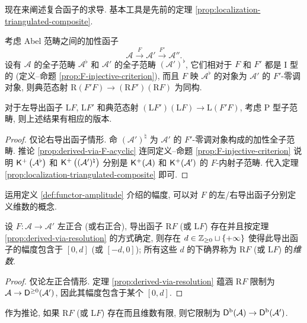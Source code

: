 现在来阐述复合函子的求导. 基本工具是先前的定理 \ref{prop:localization-triangulated-composite}.

\begin{theorem}[复合函子求导]\label{prop:derived-composite}
	考虑 Abel 范畴之间的加性函子
	\[ \mathcal{A} \xrightarrow{F} \mathcal{A}' \xrightarrow{F'} \mathcal{A}''. \]
	设有 $\mathcal{A}$ 的全子范畴 $\mathcal{A}^\flat$ 和 $\mathcal{A}'$ 的全子范畴 $(\mathcal{A}')^\flat$, 它们相对于 $F$ 和 $F'$ 都是 I 型的 (定义--命题 \ref{prop:F-injective-criterion}), 而且 $F$ 映 $\mathcal{A}^\flat$ 的对象为 $\mathcal{A}'$ 的 $F'$-零调对象, 则典范态射 $\mathrm{R}(F'F) \to (\mathrm{R}F') (\mathrm{R}F)$ 为同构.

	对于左导出函子 $\mathrm{L}F$, $\mathrm{L}F'$ 和典范态射 $\left( \mathrm{L}F' \right) \left( \mathrm{L}F \right) \to \mathrm{L}(F' F)$, 考虑 P 型子范畴, 则上述结果有相应的版本.
\end{theorem}
\begin{proof}
	仅论右导出函子情形. 命 $(\mathcal{A}')^\natural$ 为 $\mathcal{A}'$ 的 $F'$-零调对象构成的加性全子范畴. 推论 \ref{prop:derived-via-F-acyclic} 连同定义--命题 \ref{prop:F-injective-criterion} 说明 $\mathsf{K}^+ \left( \mathcal{A}^\flat \right)$ 和 $\mathsf{K}^+ \left((\mathcal{A}')^\natural\right)$ 分别是 $\mathsf{K}^+(\mathcal{A})$ 和 $\mathsf{K}^+(\mathcal{A}')$ 的 $F$-内射子范畴. 代入定理 \ref{prop:localization-triangulated-composite} 即可.
\end{proof}

运用定义 \ref{def:functor-amplitude} 介绍的幅度, 可以对 $F$ 的左/右导出函子分别定义维数的概念.

\begin{definition-proposition}\label{def:dim-functor}
	设 $F: \mathcal{A} \to \mathcal{A}'$ 左正合 (或右正合), 导出函子 $\mathrm{R}F$ (或 $\mathrm{L}F$) 存在并且按定理 \ref{prop:derived-via-resolution} 的方式确定, 则存在 $d \in \mathbb{Z}_{\geq 0} \sqcup \{+\infty\}$ 使得此导出函子的幅度包含于 $[0, d]$ (或 $[-d, 0]$); 所有这些 $d$ 的下确界称为 $\mathrm{R}F$ (或 $\mathrm{L}F$) 的\emph{维数}.
\end{definition-proposition}
\begin{proof}
	仅论左正合情形. 定理 \ref{prop:derived-via-resolution} 蕴涵 $\mathrm{R}F$ 限制为 $\mathcal{A} \to \mathsf{D}^{\geq 0}(\mathcal{A}')$, 因此其幅度包含于某个 $[0, d]$. 
\end{proof}

作为推论, 如果 $\mathrm{R}F$ (或 $\mathrm{L}F$) 存在而且维数有限, 则它限制为 $\mathsf{D}^{\mathrm{b}}(\mathcal{A}) \to \mathsf{D}^{\mathrm{b}}(\mathcal{A}')$.

